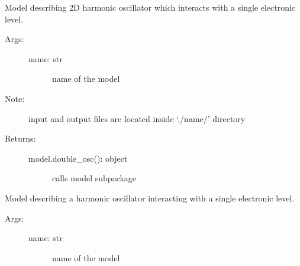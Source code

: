 \documentclass[letterpaper,10pt,english]{sphinxmanual}
\begin{document}
\begin{fulllineitems}
\begin{fulllineitems}
\begin{description}
\end{description}

\end{fulllineitems}


\begin{fulllineitems}
\label{\detokenize{modules/main:phlab.rixs.model_double_osc}}
Model describing 2D harmonic oscillator which interacts
with a single electronic level.
\begin{description}
\item[{Args:}] \leavevmode\begin{description}
\item[{name: str}] \leavevmode
name of the model

\end{description}

\item[{Note:}] \leavevmode
input and output files are located inside  ‘./name/’ directory

\item[{Returns:}] \leavevmode\begin{description}
\item[{model.double\_osc(): object}] \leavevmode
calls model sub\sphinxhyphen{}package

\end{description}

\end{description}

\end{fulllineitems}


\begin{fulllineitems}
\label{\detokenize{modules/main:phlab.rixs.model_single_osc}}
Model describing a harmonic oscillator interacting
with a single electronic level.
\begin{description}
\item[{Args:}] \leavevmode\begin{description}
\item[{name: str}] \leavevmode
name of the model


\end{description}
\end{description}
\end{fulllineitems}
\end{fulllineitems}
\end{document}
